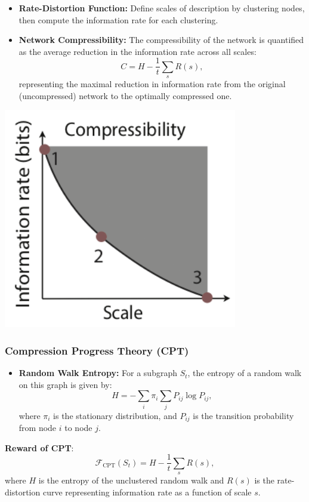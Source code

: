 \documentclass{beamer}
\begin{document}
\begin{frame}
\begin{itemize}

    \item \textbf{Rate-Distortion Function:} Define scales of description by clustering nodes, then compute the information rate for each clustering. 
    \item \textbf{Network Compressibility:} The compressibility of the network is quantified as the average reduction in the information rate across all scales:
    \begin{equation}
    C = H - \frac{1}{t} \sum_{s} R(s),
    \end{equation}
    representing the maximal reduction in information rate from the original (uncompressed) network to the optimally compressed one.
    
   
\end{itemize}
\begin{center} \includegraphics[scale=.45]{rate.png}\end{center}
\end{frame}
\begin{frame}
\frametitle{Compression Progress Theory (CPT)}
\begin{itemize}
    \item \textbf{Random Walk Entropy:} For a subgraph $S_t$, the entropy of a random walk on this graph is given by:
    \begin{equation}
    H = -\sum_{i} \pi_i \sum_{j} P_{ij} \log P_{ij},
    \end{equation}
    where $\pi_i$ is the stationary distribution, and $P_{ij}$ is the transition probability from node $i$ to node $j$.
\end{itemize}
\textbf{Reward of CPT}:
\begin{equation}
    \mathcal{F}_{\text{CPT}}(S_t) = H - \frac{1}{t} \sum_{s} R(s),
    \end{equation}
    where $H$ is the entropy of the unclustered random walk and $R(s)$ is the rate-distortion curve representing information rate as a function of scale $s$.

\end{frame}
\end{document}
